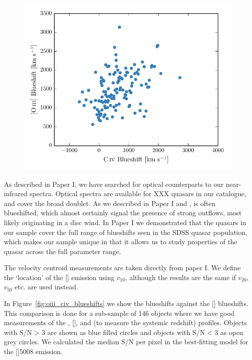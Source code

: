 \begin{figure}
    \includegraphics[width=\columnwidth]{figures/chapter04/oiii_width_civ_blueshift.pdf} 
    \caption{}     
    \label{fig:oiii_width_civ_blueshift}
\end{figure}

As described in Paper I, we have searched for optical counterparts to our near-infrared spectra. 
Optical spectra are available for XXX quasars in our catalogue, and cover the broad  doublet. 
As we described in Paper I and \citet{coatman16},  is often blueshifted, which almost certainly signal the presence of strong outflows, most likely originating in a disc wind.
In Paper I we demonstrated that the quasars in our sample cover the full range of  blueshifts seen in the SDSS quasar population, which makes our sample unique in that it allows us to study properties of the quasar across the full parameter range. 

The  velocity centroid measurements are taken directly from paper I. 
We define the `location' of the [] emission using $v_{10}$, although the results are the same if $v_{20}$, $v_{50}$ etc. are used instead.

In Figure~\ref{fig:oiii_civ_blueshifts} we show the  blueshifts against the [] blueshifts.
This comparison is done for a sub-sample of 146 objects where we have good measurements of the , [], and \hb (to measure the systemic redshift) profiles. 
Objects with S/N > 3 are shown as blue filled circles and objects with S/N < 3 as open grey circles. 
We calculated the median S/N per pixel in the best-fitting model for the []5008 emission.

